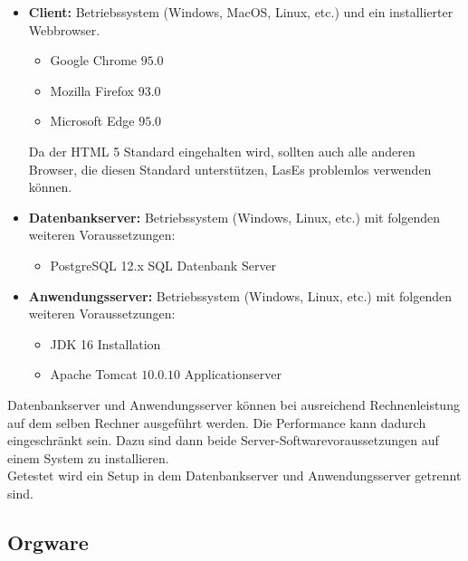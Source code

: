 \begin{itemize}

	\item \textbf{Client:} Betriebssystem (Windows, MacOS, Linux, etc.) und ein installierter Webbrowser.

	\begin{itemize}
		\item Google Chrome $95.0$
		\item Mozilla Firefox $93.0$
		\item Microsoft Edge $95.0$
	\end{itemize}

	Da der HTML 5 Standard eingehalten wird, sollten auch alle anderen Browser, die diesen Standard unterstützen, LasEs problemlos verwenden können.

	\item \textbf{Datenbankserver:} Betriebssystem (Windows, Linux, etc.) mit folgenden weiteren Voraussetzungen:

	\begin{itemize}
		\item PostgreSQL 12.x SQL Datenbank Server
	\end{itemize}

	\item \textbf{Anwendungsserver:} Betriebssystem (Windows, Linux, etc.) mit folgenden weiteren Voraussetzungen:

	\begin{itemize}
		\item JDK 16 Installation
		\item Apache Tomcat $10.0.10$ Applicationserver
	\end{itemize}

\end{itemize}

	Datenbankserver und Anwendungsserver können bei ausreichend Rechnenleistung auf dem selben Rechner ausgeführt werden. Die Performance kann dadurch eingeschränkt sein. Dazu sind dann beide Server-Softwarevoraussetzungen auf einem System zu installieren.\\
	Getestet wird ein Setup in dem Datenbankserver und Anwendungsserver getrennt sind.

\subsection{Orgware}

